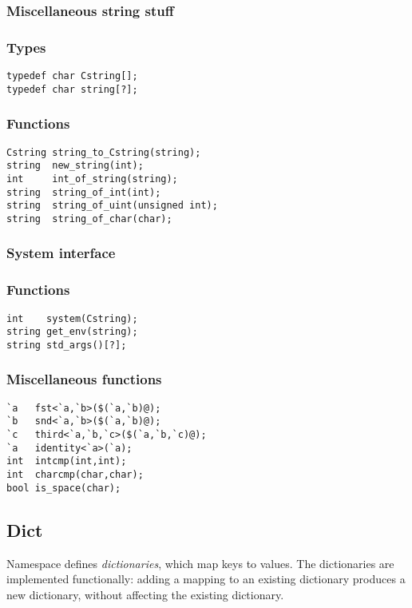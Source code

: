 \subsubsection*{Miscellaneous string stuff}
\subsubsection*{Types}
\begin{verbatim}
typedef char Cstring[];
typedef char string[?];
\end{verbatim}

\subsubsection*{Functions}
\begin{verbatim}
Cstring string_to_Cstring(string);
string  new_string(int);
int     int_of_string(string);
string  string_of_int(int);
string  string_of_uint(unsigned int);
string  string_of_char(char);
\end{verbatim}

\subsubsection*{System interface}
\subsubsection*{Functions}
\begin{verbatim}
int    system(Cstring);
string get_env(string);
string std_args()[?];
\end{verbatim}

\subsubsection*{Miscellaneous functions}
\begin{verbatim}
`a   fst<`a,`b>($(`a,`b)@);
`b   snd<`a,`b>($(`a,`b)@);
`c   third<`a,`b,`c>($(`a,`b,`c)@);
`a   identity<`a>(`a);
int  intcmp(int,int);
int  charcmp(char,char);
bool is_space(char);
\end{verbatim}

\subsection{Dict}

Namespace  defines \emph{dictionaries}, which map keys to
values.  The dictionaries are implemented functionally: adding a mapping
to an existing dictionary produces a new dictionary, without affecting
the existing dictionary.

